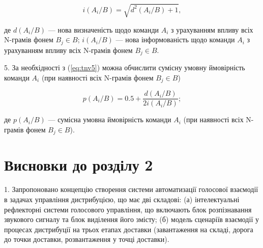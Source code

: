 \[
i(A_i/B) = \sqrt{d^2(A_i/B)+1},
\]

\noindent
де $d(A_i/B)$ --- нова визначеність щодо команди $A_i$ з урахуванням впливу всіх N-грамів фонем $B_j \in B$; $i(A_i/B)$ --- нова інформованість щодо команди $A_i$ з урахуванням впливу всіх N-грамів фонем $B_j \in B$.

5. За необхідності з (\ref{eq:tnv5}) можна обчислити сумісну умовну ймовірність команди $A_i$ (при наявності всіх N-грамів фонем $B_j \in B$)

\[
p(A_i/B)=0.5+\frac{d(A_i/B)}{2i(A_i/B)};
\]

\noindent
де $p(A_i/B)$ --- сумісна умовна ймовірність команди $A_i$ (при наявності всіх N-грамів фонем $B_j \in B$).

\section*{Висновки до розділу 2}


1. Запропоновано концепцію створення системи автоматизації голосової взаємодії в задачах управління дистрибуцією, що має дві складові: (а) інтелектуальні рефлекторні системи голосового управління, що включають блок розпізнавання звукового сигналу та блок виділення його змісту; (б) модель сценаріїв взаємодії у процесах дистрибуції на трьох етапах доставки (завантаження на складі, дорога до точки доставки, розвантаження у точці доставки).



